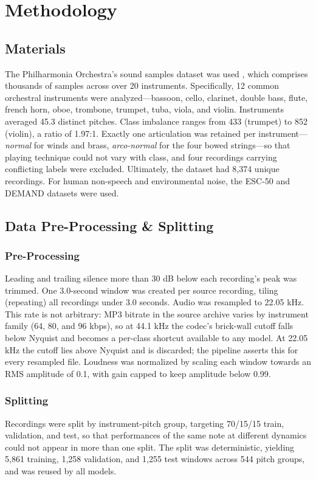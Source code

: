 \documentclass[conference]{IEEEtran}
\begin{document}
\section{Methodology}

\subsection{Materials}
The Philharmonia Orchestra's sound samples dataset was used \cite{b11}, which comprises thousands of samples across over 20 instruments. Specifically, 12 common orchestral instruments were analyzed---bassoon, cello, clarinet, double bass, flute, french horn, oboe, trombone, trumpet, tuba, viola, and violin. Instruments averaged 45.3 distinct pitches. Class imbalance ranges from 433 (trumpet) to 852 (violin), a ratio of 1.97:1. Exactly one articulation was retained per instrument---\textit{normal} for winds and brass, \textit{arco-normal} for the four bowed strings---so that playing technique could not vary with class, and four recordings carrying conflicting labels were excluded. Ultimately, the dataset had 8,374 unique recordings. For human non-speech and environmental noise, the ESC-50 \cite{b12} and DEMAND \cite{b13} datasets were used.

\subsection{Data Pre-Processing \& Splitting}
\subsubsection{Pre-Processing}
Leading and trailing silence more than 30 dB below each recording's peak was trimmed. One 3.0-second window was created per source recording, tiling (repeating) all recordings under 3.0 seconds. Audio was resampled to 22.05 kHz. This rate is not arbitrary: MP3 bitrate in the source archive varies by instrument family (64, 80, and 96 kbps), so at 44.1 kHz the codec's brick-wall cutoff falls below Nyquist and becomes a per-class shortcut available to any model. At 22.05 kHz the cutoff lies above Nyquist and is discarded; the pipeline asserts this for every resampled file. Loudness was normalized by scaling each window towards an RMS amplitude of 0.1, with gain capped to keep amplitude below 0.99.
\subsubsection{Splitting}
Recordings were split by instrument-pitch group, targeting 70/15/15 train, validation, and test, so that performances of the same note at different dynamics could not appear in more than one split. The split was deterministic, yielding 5,861 training, 1,258 validation, and 1,255 test windows across 544 pitch groups, and was reused by all models.
\end{document}
